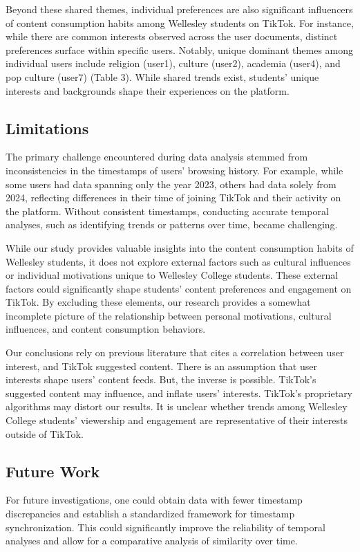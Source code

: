 \documentclass[acmtog]{acmart}
\begin{document}
Beyond these shared themes, individual preferences are also significant influencers of content consumption habits among Wellesley students on TikTok. For instance, while there are common interests observed across the user documents, distinct preferences surface within specific users. Notably, unique dominant themes among individual users include religion (user1), culture (user2), academia (user4), and pop culture (user7) (Table 3). While shared trends exist, students' unique interests and backgrounds shape their experiences on the platform.

\subsection{Limitations}
The primary challenge encountered during data analysis stemmed from inconsistencies in the timestamps of users' browsing history. For example, while some users had data spanning only the year 2023, others had data solely from 2024, reflecting differences in their time of joining TikTok and their activity on the platform. Without consistent timestamps, conducting accurate temporal analyses, such as identifying trends or patterns over time, became challenging. 

While our study provides valuable insights into the content consumption habits of Wellesley students, it does not explore external factors such as cultural influences or individual motivations unique to Wellesley College students. These external factors could significantly shape students' content preferences and engagement on TikTok. By excluding these elements, our research provides a somewhat incomplete picture of the relationship between personal motivations, cultural influences, and content consumption behaviors.

Our conclusions rely on previous literature that cites a correlation between user interest, and TikTok suggested content. There is an assumption that user interests shape users' content feeds. But, the inverse is possible. TikTok's suggested content may influence, and inflate users' interests. TikTok's proprietary algorithms may distort our results. It is unclear whether trends among Wellesley College students' viewership and engagement are representative of their interests outside of TikTok.  

\subsection{Future Work}
For future investigations, one could obtain data with fewer timestamp discrepancies and establish a standardized framework for timestamp synchronization. This could significantly improve the reliability of temporal analyses and allow for a comparative analysis of similarity over time. 
\end{document}
